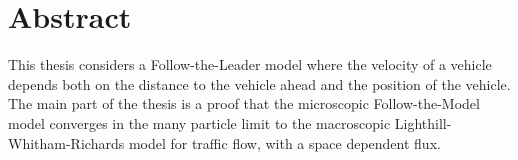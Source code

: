 \chapter*{Abstract}

This thesis considers a Follow-the-Leader model where the velocity of a vehicle depends both on the distance to the vehicle ahead and the position of the vehicle. The main part of the thesis is a proof that the microscopic Follow-the-Model model converges in the many particle limit to the macroscopic Lighthill-Whitham-Richards model for traffic flow, with a space dependent flux. 

\iffalse
The \texttt{ntnuthesis} document class is a customised version of the standard \LaTeX{} \texttt{report} document class. It can be used for theses at all levels – bachelor, master and PhD – and is available in English (British and American) and Norwegian (Bokmål and Nynorsk). This document is ment to serve (i) as a description of the document class, (ii) as an example of how to use it, and (iii) as a thesis template.
\fi